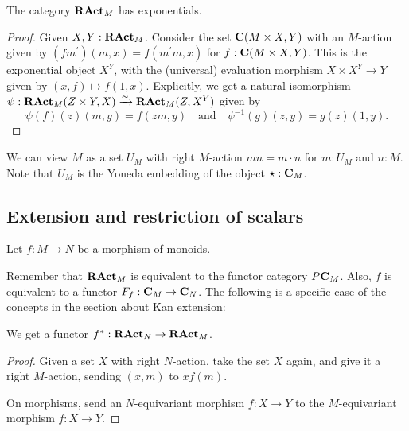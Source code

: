 \begin{lemma}
  The category $ \mathbf{RAct}_{M} $ has exponentials.
\end{lemma}
\begin{proof}
  Given $ X, Y : \mathbf{RAct}_{M} $. Consider the set $ \mathbf{C}(M \times X, Y) $ with an $ M $-action given by $ (f m^\prime)(m, x) = f(m^\prime m, x) $ for $ f : \mathbf{C}(M \times X, Y) $. This is the exponential object $ X^Y $, with the (universal) evaluation morphism $ X \times X^Y \to Y $ given by $ (x, f) \mapsto f(1, x) $. Explicitly, we get a natural isomorphism $ \psi: \mathbf{RAct}_{M}(Z \times Y, X) \xrightarrow \sim \mathbf{RAct}_{M}(Z, X^Y) $ given by
  \[ \psi(f)(z)(m, y) = f(z m, y) \quad \text{and} \quad \psi^{-1}(g)(z, y) = g(z)(1, y). \]
\end{proof}

\begin{definition}
  We can view $ M $ as a set $ U_M $ with right $ M $-action $ m n = m \cdot n $ for $ m: U_M $ and $ n: M $. Note that $ U_M $ is the Yoneda embedding of the object $ \star : \mathbf{C}_M $.
\end{definition}

\subsection{Extension and restriction of scalars}

Let $ f: M \to N $ be a morphism of monoids.

Remember that $ \mathbf{RAct}_{M} $ is equivalent to the functor category $ P \mathbf{C}_M $. Also, $ f $ is equivalent to a functor $ F_f : \mathbf{C}_M \to \mathbf{C}_N $. The following is a specific case of the concepts in the section about Kan extension:

\begin{lemma}
  We get a  functor $ f^* : \mathbf{RAct}_{N} \to \mathbf{RAct}_{M} $.
\end{lemma}
\begin{proof}
  Given a set $ X $ with right $ N $-action, take the set $ X $ again, and give it a right $ M $-action, sending $ (x, m) $ to $ x f(m) $.

  On morphisms, send an $ N $-equivariant morphism $ f: X \to Y $ to the $ M $-equivariant morphism $ f: X \to Y $.
\end{proof}

